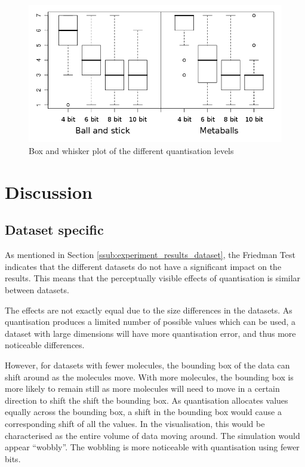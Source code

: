 \begin{figure}[h!]
  \begin{center}
    \includegraphics[width=120mm]{boxwhisker_all_both}
  \end{center}
  \caption{Box and whisker plot of the different quantisation levels}
  \label{fig:experiment_boxwhisker_all}
\end{figure}




\section{Discussion}
\label{sec:experiment_discussion}

\subsection{Dataset specific}
\label{sub:experiment_discussion_dataset}

As mentioned in Section \ref{ssub:experiment_results_dataset}, the Friedman
Test indicates that the different datasets do not have a significant impact on
the results. This means that the perceptually visible effects of quantisation
is similar between datasets.

The effects are not exactly equal due to the size differences in the datasets.
As quantisation produces a limited number of possible values which can be used,
a dataset with large dimensions will have more quantisation error, and thus
more noticeable differences.

However, for datasets with fewer molecules, the bounding box of the data can
shift around as the molecules move.  With more molecules, the bounding box is
more likely to remain still as more molecules will need to move in a certain
direction to shift the shift the bounding box.  As quantisation allocates
values equally across the bounding box, a shift in the bounding box would cause
a corresponding shift of all the values. In the visualisation, this would be
characterised as the entire volume of data moving around. The simulation would
appear ``wobbly''. The wobbling is more noticeable with quantisation using
fewer bits.

